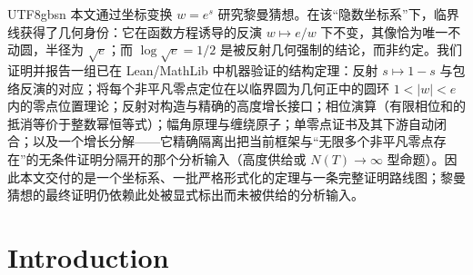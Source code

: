 \documentclass[submission]{jsfds}
\begin{document}
\begin{frontmatter}
\begin{keywords}
\end{keywords}

\begin{altabstract}
\begin{CJK*}{UTF8}{gbsn}
本文通过坐标变换 $w=e^{s}$ 研究黎曼猜想。在该“隐数坐标系”下，临界线获得了几何身份：它在函数方程诱导的反演 $w\mapsto e/w$ 下不变，其像恰为唯一不动圆，半径为 $\sqrt{e}$；而 $\log\sqrt{e}=1/2$ 是被反射几何强制的结论，而非约定。我们证明并报告一组已在 Lean/MathLib 中机器验证的结构定理：反射 $s\mapsto 1-s$ 与包络反演的对应；将每个非平凡零点定位在以临界圆为几何正中的圆环 $1<|w|<e$ 内的零点位置理论；反射对构造与精确的高度增长接口；相位演算（有限相位和的抵消等价于整数幂恒等式）；幅角原理与缠绕原子；单零点证书及其下游自动闭合；以及一个增长分解——它精确隔离出把当前框架与“无限多个非平凡零点存在”的无条件证明分隔开的那个分析输入（高度供给或 $N(T)\to\infty$ 型命题）。因此本文交付的是一个坐标系、一批严格形式化的定理与一条完整证明路线图；黎曼猜想的最终证明仍依赖此处被显式标出而未被供给的分析输入。
\end{CJK*}
\end{altabstract}

\begin{altkeywords}
\end{altkeywords}

\begin{AMSclass}
\end{AMSclass}
\end{frontmatter}

\section{Introduction}\label{sec:intro}
\end{document}
